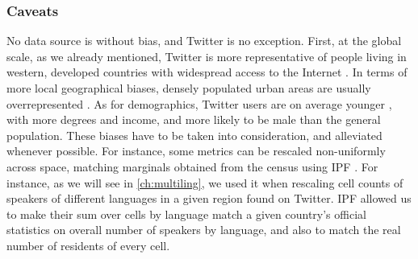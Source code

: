 \documentclass[../thesis.tex]{subfiles}
\begin{document}
\subsubsection{Caveats}
No data source is without bias, and Twitter is no exception. First, at the global scale,
as we already mentioned, Twitter is more representative of people living in western,
developed countries with widespread access to the Internet
\cite{HawelkaGeolocatedTwitter2014,MocanuTwitterBabel2013}. In terms of more local
geographical biases, densely populated urban areas are usually overrepresented
\cite{MisloveUnderstandingDemographics2011,JiangUnderstandingDemographic2019,AuxierSocialMedia2021}.
As for demographics, Twitter users are on average younger
\cite{NguyenHowOld2013,AuxierSocialMedia2021,SloanWhoTweets2017}, with more degrees and
income, and more likely to be male
\cite{MisloveUnderstandingDemographics2011,AuxierSocialMedia2021,SloanWhoTweets2017}
than the general population. These biases have to be taken into consideration, and
alleviated whenever possible. For instance, some metrics can be rescaled non-uniformly
across space, matching marginals obtained from the census using \ac{IPF}
\cite{DemingLeastSquares1940,FienbergIterativeProcedure1970}. For instance, as we will
see in \cref{ch:multiling}, we used it when rescaling cell counts of speakers of
different languages in a given region found on Twitter. \Ac{IPF} allowed us to make
their sum over cells by language match a given country's official statistics on overall
number of speakers by language, and also to match the real number of residents of every
cell.
\end{document}
